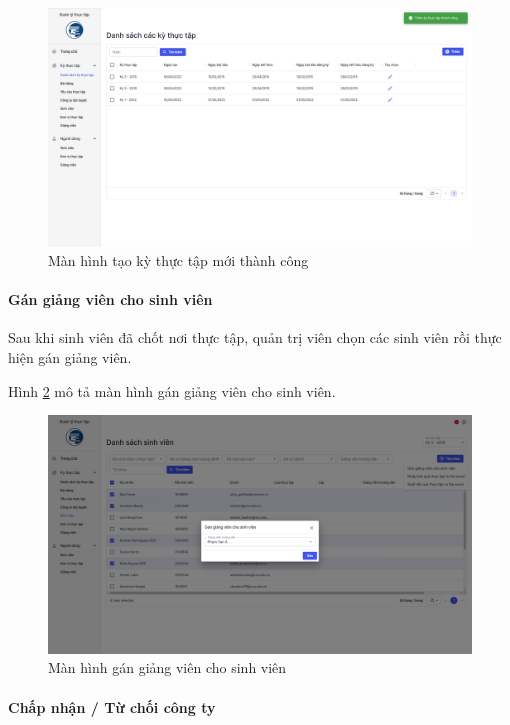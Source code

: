 \documentclass[./../main.tex]{subfiles}
\begin{document}
\begin{figure}[]
	\includegraphics[width=\linewidth]{./images/image20.png}
	\caption{Màn hình tạo kỳ thực tập mới thành công}
	\label{fig:add_term_success}
\end{figure}

\paragraph*{Gán giảng viên cho sinh viên}

Sau khi sinh viên đã chốt nơi thực tập, quản trị viên chọn các sinh viên rồi thực hiện gán giảng viên.

Hình \ref{fig:assign_lecturer} mô tả màn hình gán giảng viên cho sinh viên.

\begin{figure}[]
	\includegraphics[width=\linewidth]{./images/image22.png}
	\caption{Màn hình gán giảng viên cho sinh viên}
	\label{fig:assign_lecturer}
\end{figure}

\paragraph*{Chấp nhận / Từ chối công ty}
\end{document}
